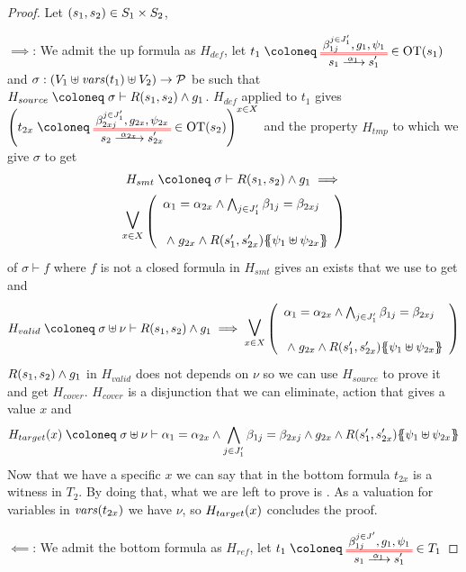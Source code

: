\documentclass{article}
\begin{document}
\begin{proof} Let \({\left(s_1, s_2\right)} \in S_1 \times S_2\),
\item[\(\implies\):] We admit the up formula as \(H_{def}\), let \(t_1 \defobject \OTx{1}{}{1}{1} \in \fOT{s_1}\) and \(\sigma: {\left(V_1 \uplus \mathit{vars}{\left(t_1\right)} \uplus V_2\right)} \to \mathcal{P}\) be such that \(H_{source} \defobject \sigma \vdash R\mpar{s_1, s_2} \wedge g_1\).
	\(H_{def}\) applied to \(t_1\) gives \(\mpar{t_{2x} \defobject \OTx{2}{x}{2x}{1} \in \fOT{s_2}}^{x \in X}\) and the property \(H_{tmp}\) to which we give \(\sigma\) to get
	\begin{multline*}
		H_{smt} \defobject \sigma \vdash R\mpar{s_1, s_2} \wedge g_1 \implies \\
		\operatorname*{\bigsymb{\bigvee}}_{x \in X} \mpar{\begin{array}{l}
			\alpha_1 = \alpha_{2x} \wedge \bigwedge_{j \in J'_1} \beta_{1j} = \beta_{2xj} \\[12pt]
			\nwedge g_{2x} \wedge R\mpar{s'_1, s'_{2x}}\psubst{\psi_1 \uplus \psi_{2x}}
		\end{array}}
	\end{multline*}
	 of \(\sigma \vdash f\) where \(f\) is not a closed formula in \(H_{smt}\) gives an exists that we use to get  and
	\[ H_{valid} \defobject \sigma \uplus \nu \vdash R\mpar{s_1, s_2} \wedge g_1 \implies \operatorname*{\bigsymb{\bigvee}}_{x \in X} \mpar{\begin{array}{l}
		\alpha_1 = \alpha_{2x} \wedge \bigwedge_{j \in J'_1} \beta_{1j} = \beta_{2xj} \\[12pt]
		\nwedge g_{2x} \wedge R\mpar{s'_1, s'_{2x}}\psubst{\psi_1 \uplus \psi_{2x}}
	\end{array}} \]
	\(R{\left(s_1, s_2\right)} \wedge g_1\) in \(H_{valid}\) does not depends on \(\nu\) so we can use \(H_{source}\) to prove it and get \(H_{cover}\).
	\(H_{cover}\) is a disjunction that we can eliminate, action that gives a value \(x\) and
	\[ H_{target}\mpar{x} \defobject \sigma \uplus \nu \vdash \alpha_1 = \alpha_{2x} \wedge \bigwedge_{j \in J'_1} \beta_{1j} = \beta_{2xj} \wedge g_{2x} \wedge R\mpar{s'_1, s'_{2x}}\psubst{\psi_1 \uplus \psi_{2x}} \]
	Now that we have a specific \(x\) we can say that in the bottom formula \(t_{2x}\) is a witness in \(T_2\).
	By doing that, what we are left to prove is .
	As a valuation for variables in \(\mathit{vars}{\left(t_{2x}\right)}\) we have \(\nu\), so \(H_{target}{\left(x\right)}\) concludes the proof.
\item[\(\impliedby\):] We admit the bottom formula as \(H_{ref}\), let \(t_1 \defobject \OTx{1}{}{1}{} \in T_1\) %
\end{proof}
\end{document}

